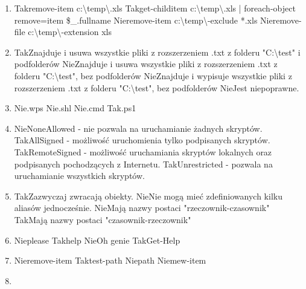 \begin{enumerate}
		{Nie}{Jest to niepoprawna składnia.}
		\item {}%
		{Tak}{remove-item c:\textbackslash temp\textbackslash *.xls}%
		{Tak}{get-childitem c:\textbackslash temp\textbackslash *.xls | foreach-object { remove=item \$\_.fullname }}%
		{Nie}{remove-item c:\textbackslash temp\textbackslash * -exclude *.xls}%
		{Nie}{remove-file c:\textbackslash temp\textbackslash * -extension xls}
		\item {}%
		{Tak}{Znajduje i usuwa wszystkie pliki z rozszerzeniem .txt z folderu "C:\textbackslash test" i podfolderów}%
		{Nie}{Znajduje i usuwa wszystkie pliki z rozszerzeniem .txt z folderu "C:\textbackslash test", bez podfolderów}%
		{Nie}{Znajduje i wypisuje wszystkie pliki z rozszerzeniem .txt z folderu "C:\textbackslash test", bez podfolderów}%
		{Nie}{Jest niepoprawne.}
		\newpage
		\item {}%
		{Nie}{.wps}%
		{Nie}{.shl}%
		{Nie}{.cmd}%
		{Tak}{.ps1}
		\item {}%
		{Nie}{NoneAllowed - nie pozwala na uruchamianie żadnych skryptów.}%
		{Tak}{AllSigned - możliwość uruchomienia tylko podpisanych skryptów.}%
		{Tak}{RemoteSigned - możliwość uruchamiania skryptów lokalnych oraz podpisanych pochodzących z Internetu.}%
		{Tak}{Unrestricted - pozwala na uruchamianie wszystkich skryptów.}
		\item {}%
		{Tak}{Zazwyczaj zwracają obiekty.}%
		{Nie}{Nie mogą mieć zdefiniowanych kilku aliasów jednocześnie.}%
		{Nie}{Mają nazwy postaci "rzeczownik-czasownik"}%
		{Tak}{Mają nazwy postaci "czasownik-rzeczownik"}
		\item {}%
		{Nie}{please}%
		{Tak}{help}%
		{Nie}{Oh genie}%
		{Tak}{Get-Help}
		\item {}%
		{Nie}{remove-item}%
		{Tak}{test-path}%
		{Nie}{path}%
		{Nie}{mew-item}
		\item {}%

\end{enumerate}
